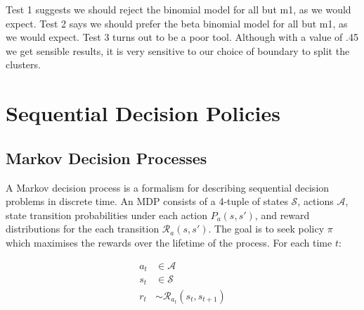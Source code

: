 \documentclass[11pt,a4,singlespacing,titlepagenumber=on]{scrreprt}
\numberwithin{equation}{chapter} %
\theoremstyle{remark}
\begin{document}
Test 1 suggests we should reject the binomial model for all but m1, as we would expect.
Test 2 says we should prefer the beta binomial model for all but m1, as we would expect. 
Test 3 turns out to be a poor tool. Although with a value of .45 we get sensible results, it is very sensitive to our choice of boundary to split the clusters.


%

\chapter{ Sequential Decision Policies }

\section{ Markov Decision Processes }

A Markov decision process is a formalism for describing sequential decision problems in discrete time. An MDP consists of a 4-tuple of states $\mathcal{S}$, actions $\mathcal{A}$, state transition probabilities under each action $P_a(s,s')$, and reward distributions for the each transition $\mathcal{R}_a(s,s')$. The goal is to seek policy $\pi$ which maximises the rewards over the lifetime of the process. For each time $t$:

\begin{align}
a_t &\in \mathcal{A} \\
s_t &\in \mathcal{S} \\
r_t &\sim \mathcal{R}_{a_t}(s_t,s_{t+1})
\end{align}
\end{document}
